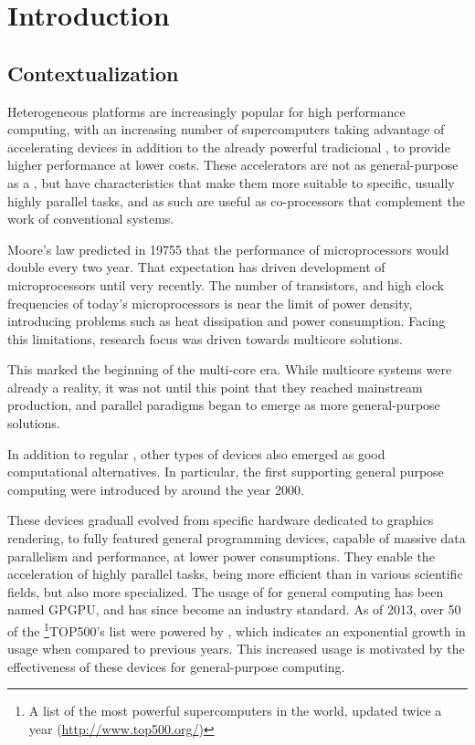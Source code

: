 \documentclass[main.tex]{subfiles}
\begin{document}
\chapter{Introduction}

\section{Contextualization}

Heterogeneous platforms are increasingly popular for high performance computing, with an increasing number of supercomputers taking advantage of accelerating devices in addition to the already powerful tradicional \cpus, to provide higher performance at lower costs. These accelerators are not as general-purpose as a \cpu, but have characteristics that make them more suitable to specific, usually highly parallel tasks, and as such are useful as co-processors that complement the work of conventional systems.

Moore's law \cite{moore1965cramming,moore1975progress} predicted in 19755 that the performance of microprocessors would double every two year. That expectation has driven development of microprocessors until very recently. The number of transistors, and high clock frequencies of today's microprocessors is near the limit of power density, introducing problems such as heat dissipation and power consumption. Facing this limitations, research focus was driven towards multicore solutions.

This marked the beginning of the multi-core era. While multicore systems were already a reality, it was not until this point that they reached mainstream production, and parallel paradigms began to emerge as more general-purpose solutions.

In addition to regular \cpus, other types of devices also emerged as good computational alternatives. In particular, the first \gpus supporting general purpose computing were introduced by \nvidia around the year 2000.

These devices graduall evolved from specific hardware dedicated to graphics rendering, to fully featured general programming devices, capable of massive data parallelism and performance, at lower power consumptions.
They enable the acceleration of highly parallel tasks, being more efficient than \cpus in various scientific fields, but also more specialized. The usage of \gpus for general computing has been named \ac{GPGPU}, and has since become an industry standard.
As of 2013, over 50 of the \footnote{A list of the most powerful supercomputers in the world, updated twice a year (\url{http://www.top500.org/})}{TOP500's} list were powered by \gpus, which indicates an exponential growth in usage when compared to previous years. This increased usage is motivated by the effectiveness of these devices for general-purpose computing.
\end{document}
